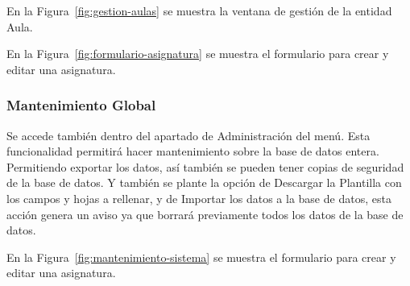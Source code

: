 En la Figura~\ref{fig:gestion-aulas} se muestra la ventana de gestión de la entidad Aula.


En la Figura~\ref{fig:formulario-asignatura} se muestra el formulario para crear y editar una asignatura.



\subsubsection{Mantenimiento Global}

Se accede también dentro del apartado de Administración del menú. Esta funcionalidad permitirá hacer mantenimiento sobre la base de datos entera. Permitiendo exportar los datos, así también se pueden tener copias de seguridad de la base de datos. Y también se plante la opción de Descargar la Plantilla con los campos y hojas a rellenar, y de Importar los datos a la base de datos, esta acción genera un aviso ya que borrará previamente todos los datos de la base de datos.

En la Figura~\ref{fig:mantenimiento-sistema} se muestra el formulario para crear y editar una asignatura.





